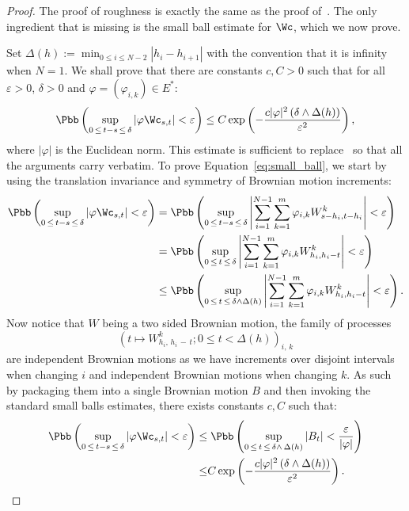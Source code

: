 \begin{proof}
The proof of roughness is exactly the same as the proof of~\cite[Proposition~6.11]{FH14}. The only ingredient that is missing is the small ball estimate for $\Wc$, which we now prove.

Set $\Delta(h):= \min_{0 \leq i \leq N-2} \left|h_i - h_{i+1}\right|$ with the convention that it is infinity when $N=1$. We shall prove that there are constants $c, C > 0$ such that for all $\varepsilon>0$, $\delta>0$ and $\varphi = \left(\varphi_{i,k} \right) \in E^*$:
\begin{equation}\label{eq:small_ball}
\Pbb\left(\sup_{0\,\leq\,t-s\,\leq\,\delta} \left| \varphi \Wc_{s,t} \right| < \varepsilon \right)
\leq C \exp\left(-\frac{c |\varphi|^2 \left(\delta \wedge \Delta(h) \right) }{\varepsilon^2} \right),
\end{equation}
where $|\varphi|$ is the Euclidean norm. This estimate is sufficient to replace~\cite[Equation~(6.11) p.~91]{FH14} so that all the arguments carry verbatim. To prove Equation~\eqref{eq:small_ball}, we start by using the translation invariance and symmetry of Brownian motion increments:
\begin{align*}
\Pbb\left(\sup_{0\,\leq\,t-s\,\leq\,\delta} \left| \varphi \Wc_{s,t} \right| < \varepsilon \right)
& = \Pbb\left(\sup_{0\,\leq\,t-s\,\leq\,\delta}
\left| \sum_{i=1}^{N-1} \sum_{k=1}^m \varphi_{i,k} W_{s-h_i, t-h_i}^k\right| < \varepsilon \right)\\
& =\Pbb\left(\sup_{0\,\leq\,t\,\leq\,\delta}
\left| \sum_{i=1}^{N-1} \sum_{k=1}^m \varphi_{i,k} W_{h_i, h_i-t}^k\right| < \varepsilon \right)\\
& \leq\Pbb\left(\sup_{0\,\leq\,t\,\leq\,\delta \wedge \Delta(h)}
\left| \sum_{i=1}^{N-1} \sum_{k=1}^m \varphi_{i,k} W_{h_i, h_i-t}^k\right| < \varepsilon \right).\\
\end{align*}
Now notice that $W$ being a two sided Brownian motion, the family of processes
\[
\left(t \mapsto W_{h_i,\,h_i\,-\,t}^k ; 0 \leq t <\Delta(h) \right)_{i,\,k}
\]
are independent Brownian motions as we have increments over disjoint intervals when changing $i$ and independent Brownian motions when changing $k$. As such by packaging them into a single Brownian motion $B$ and then invoking the standard small balls estimates, there exists constants $c, C$ such that:
\begin{align*}
\Pbb\left(\sup_{0\,\leq\,t-s\,\leq\,\delta} \left| \varphi \Wc_{s,t} \right| < \varepsilon \right)
\leq &\;\Pbb\left(\sup_{0\,\leq\,t\,\leq\,\delta \wedge\,\Delta(h)}
\left| B_t \right| < \frac{\varepsilon}{|\varphi|}\right) \\
\leq & C \exp\left(-\frac{c |\varphi|^2 \left(\delta \wedge \Delta(h) \right) }{\varepsilon^2} \right) .\qedhere
\end{align*}
\end{proof}

